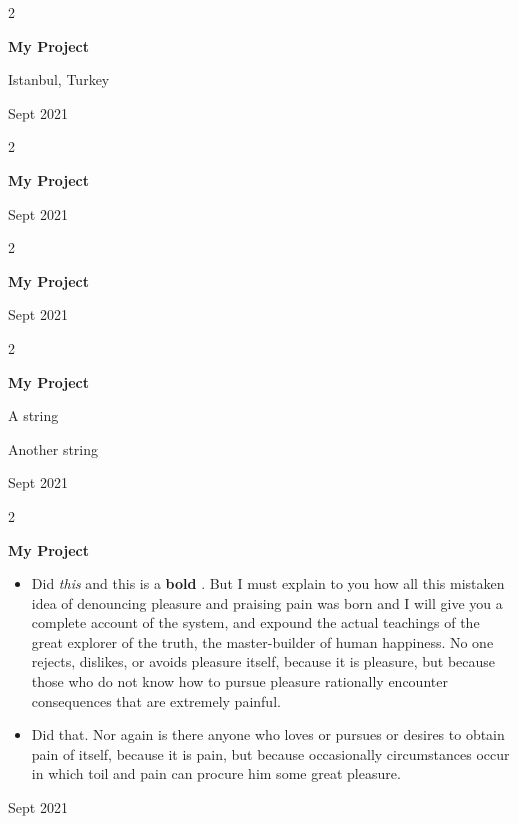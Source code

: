 \documentclass[10pt, letterpaper]{article}
\newenvironment{summary}{
    \begin{description}[
        topsep=0.10 cm,
        parsep=0.10 cm,
        partopsep=0pt,
        itemsep=0pt,
        leftmargin=0.4 cm + 10pt
    ]
}{
    \end{description}
} %
\newenvironment{highlights}{
    \begin{itemize}[
        topsep=0.10 cm,
        parsep=0.10 cm,
        partopsep=0pt,
        itemsep=0pt,
        leftmargin=0.4 cm + 10pt
    ]
}{
    \end{itemize}
} %
\newenvironment{twocolentry}[2][]{
    \onecolentry
    \def\secondColumn{#2}
    \setcolumnwidth{\fill, 4.5 cm}
    \begin{paracol}{2}
}{
    \switchcolumn \raggedleft \secondColumn
    \end{paracol}
    \endonecolentry
} %
\let\hrefWithoutArrow\href
\renewcommand{\href}[2]{\hrefWithoutArrow{#1}{\ifthenelse{\equal{#2}{}}{ }{#2 }\raisebox{.15ex}{\footnotesize \faExternalLink*}}}
\begin{document}
        \vspace{0.2 cm}

        \begin{twocolentry}{
            Istanbul, Turkey

        Sept 2021
        }
            \textbf{My Project}
        \end{twocolentry}


        \vspace{0.2 cm}

        \begin{twocolentry}{
            Sept 2021
        }
            \textbf{My Project}
        \end{twocolentry}


        \vspace{0.2 cm}

        \begin{twocolentry}{
            Sept 2021
        }
            \textbf{My Project}
        \end{twocolentry}


        \vspace{0.2 cm}

        \begin{twocolentry}{
            Sept 2021
        }
            \textbf{My Project}
            \begin{summary}
                \item A string
                \item Another string
            \end{summary}
        \end{twocolentry}


        \vspace{0.2 cm}

        \begin{twocolentry}{
            Sept 2021
        }
            \textbf{My Project}
            \begin{highlights}
                \item Did \textit{this} and this is a \textbf{bold} \href{https://example.com}{link}. But I must explain to you how all this mistaken idea of denouncing pleasure and praising pain was born and I will give you a complete account of the system, and expound the actual teachings of the great explorer of the truth, the master-builder of human happiness. No one rejects, dislikes, or avoids pleasure itself, because it is pleasure, but because those who do not know how to pursue pleasure rationally encounter consequences that are extremely painful.
                \item Did that. Nor again is there anyone who loves or pursues or desires to obtain pain of itself, because it is pain, but because occasionally circumstances occur in which toil and pain can procure him some great pleasure.
            \end{highlights}
        \end{twocolentry}
\end{document}
